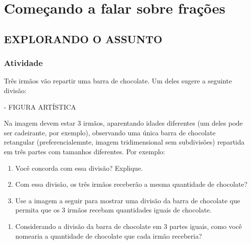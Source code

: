 \documentclass[a4,12pt]{book}
\begin{document}
\chapter{Começando a falar sobre frações }


\section{ EXPLORANDO O ASSUNTO }


\subsection{Atividade}

Três irmãos vão repartir uma barra de chocolate. Um deles sugere a seguinte divisão:

\begin{imagem*}[breakable]{}{}   - FIGURA ARTÍSTICA

  Na imagem devem estar 3 irmãos, aparentando idades diferentes (um deles pode ser cadeirante, por exemplo), observando uma única barra de chocolate retangular (preferencialemnte, imagem tridimensional sem subdivisões) repartida em três partes com tamanhos diferentes. Por exemplo:


\end{imagem*}

\begin{enumerate} [\quad a)] %
  \item     Você concorda com essa divisão? Explique.
  \item     Com essa divisão, os três irmãos receberão a mesma quantidade de chocolate?
  \item     Use a imagem a seguir para mostrar uma divisão da barra de chocolate que permita que os 3 irmãos recebam quantidades iguais de chocolate.
\end{enumerate} %
\begin{enumerate} [\quad a)] %
  \item     Considerando a divisão da barra de chocolate em 3 partes iguais, como você nomearia a quantidade de chocolate que cada irmão receberia?
\end{enumerate} %
\end{document}
